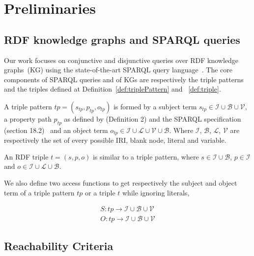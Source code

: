\section{Preliminaries}

\subsection{RDF knowledge graphs and SPARQL queries}
Our work focuses on conjunctive and disjunctive queries over RDF knowledge graphs~(KG) using the state-of-the-art SPARQL query language~\cite{w3SPARQLQuery}.
The core components of SPARQL queries and of KGs are respectively the triple patterns and the triples defined at Definition~\ref{def:triplePattern} and ~\ref{def:triple}.

\begin{definition}\label{def:triplePattern}
    A triple pattern $tp = (s_{tp}, p_{tp}, o_{tp})$ is formed by a subject term $s_{tp} \in \mathcal{I} \cup \mathcal{B} \cup \mathcal{V}$, 
    a property path  $p_{tp}$ as defined by  \citeauthor{Kostylev2015} (Definition 2) and the SPARQL specification (section 18.2)~\cite{w3SPARQLQuery} 
    and an object term  $o_{tp} \in \mathcal{I} \cup \mathcal{L} \cup \mathcal{V} \cup \mathcal{B}$.
    Where $\mathcal{I}$, $\mathcal{B}$, $\mathcal{L}$, $\mathcal{V}$ are respectively the set of every possible IRI, blank node, literal and variable.
\end{definition}

\begin{definition}[Triple]\label{def:triple}
    An RDF triple $t = (s,p,o)$ is similar to a triple pattern, 
    where $s \in\mathcal{I} \cup \mathcal{B}$,
    $p \in \mathcal{I}$ and $o \in \mathcal{I} \cup \mathcal{L} \cup \mathcal{B}$.
\end{definition}

We also define two access functions to get respectively the subject and object term of a triple pattern $tp$ or a triple $t$ while ignoring literals,

\begin{equation}
    \begin{aligned}
        S: tp \rightarrow \mathcal{I} \cup \mathcal{B} \cup \mathcal{V} \\
        O: tp \rightarrow \mathcal{I} \cup \mathcal{B} \cup \mathcal{V}
    \end{aligned}
 \end{equation}

\subsection{Reachability Criteria}

